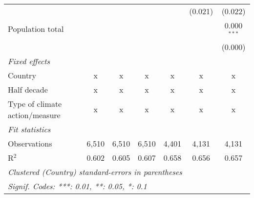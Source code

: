 \begin{tabular}{lcccccc}
                                                                                         &                &                &                &                & (0.021)        & (0.022)\\   
   Population total                                                                      &                &                &                &                &                & 0.000$^{***}$\\   
                                                                                         &                &                &                &                &                & (0.000)\\   
   \emph{Fixed effects}\\
   Country                                                                               & x              & x              & x              & x              & x              & x\\  
   Half decade                                                                           & x              & x              & x              & x              & x              & x\\  
   Type of climate action/measure                                                        & x              & x              & x              & x              & x              & x\\  
   \midrule \emph{Fit statistics}\\
   Observations                                                                          & 6,510          & 6,510          & 6,510          & 4,401          & 4,131          & 4,131\\  
   R$^2$                                                                                 & 0.602          & 0.605          & 0.607          & 0.658          & 0.656          & 0.657\\  
   \midrule
   \multicolumn{7}{l}{\emph{Clustered (Country) standard-errors in parentheses}}\\
   \multicolumn{7}{l}{\emph{Signif. Codes: ***: 0.01, **: 0.05, *: 0.1}}\\
\end{tabular}
\par\endgroup


